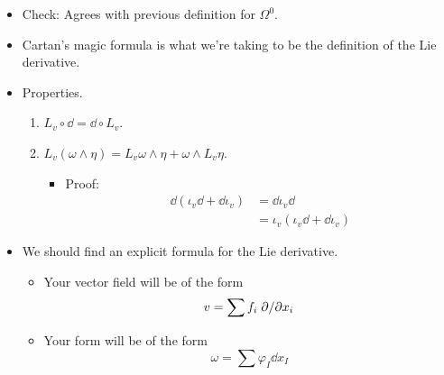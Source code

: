 \documentclass[../notes.tex]{subfiles}
\begin{document}
\begin{itemize}
\begin{itemize}
    \end{itemize}
    \item Check: Agrees with previous definition for $\Omega^0$.
    \item Cartan's magic formula is what we're taking to be the definition of the Lie derivative.
    \item Properties.
    \begin{enumerate}
        \item $L_v\circ\dd=\dd\circ L_v$.
        \item $L_v(\omega\wedge\eta)=L_v\omega\wedge\eta+\omega\wedge L_v\eta$.
        \begin{itemize}
            \item Proof:
            \begin{align*}
                \dd(\iota_v\dd+\dd\iota_v) &= \dd\iota_v\dd\\
                &= \iota_v(\iota_v\dd+\dd\iota_v)
            \end{align*}
        \end{itemize}
    \end{enumerate}
    \item We should find an explicit formula for the Lie derivative.
    \begin{itemize}
        \item Your vector field will be of the form
        \begin{equation*}
            v = \sum f_i\pdv*{x_i}
        \end{equation*}
        \item Your form will be of the form
        \begin{equation*}
            \omega = \sum\varphi_I\dd{x_I}
        \end{equation*}
    \end{itemize}
\end{itemize}
\end{document}

